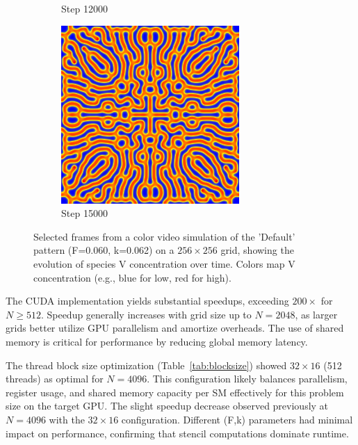 \documentclass[9pt]{IEEEtran} %
\begin{document}
\begin{figure}[H]
\begin{subfigure}[b]{0.32\columnwidth}
        \caption{Step 12000} %
        \label{fig:video_e}
    \end{subfigure}
    \hfill
    \begin{subfigure}[b]{0.32\columnwidth}
        \includegraphics[width=\textwidth]{frame_00299.png} %
        \caption{Step 15000} %
        \label{fig:video_f}
    \end{subfigure}

    \caption{Selected frames from a color video simulation of the 'Default' pattern (F=0.060, k=0.062) on a $256 \times 256$ grid, showing the evolution of species V concentration over time. Colors map V concentration (e.g., blue for low, red for high).}
    \label{fig:video_frames}
\end{figure}

The CUDA implementation yields substantial speedups, exceeding $200\times$ for $N \ge 512$. Speedup generally increases with grid size up to $N=2048$, as larger grids better 
utilize GPU parallelism and amortize overheads. The use of shared memory is critical for performance by reducing global memory latency.

The thread block size optimization (Table~\ref{tab:blocksize}) showed $32 \times 16$ (512 threads) as optimal for $N=4096$. This configuration likely balances parallelism, 
register usage, and shared memory capacity per SM effectively for this problem size on the target GPU. The slight speedup decrease observed previously at $N=4096$ with 
the $32 \times 16$ configuration. Different (F,k) parameters had minimal impact on performance, confirming that stencil computations 
dominate runtime.
\end{document}
